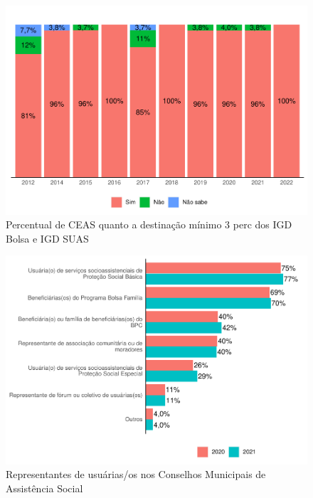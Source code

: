 \documentclass[
  brazilian]{report}
\begin{document}
\begin{figure}
\includegraphics{Censo-SUAS-2022_files/figure-latex/ceas_igd-1} \caption[Percentual de CEAS quanto a destinação mínimo 3 perc dos IGD Bolsa e IGD SUAS]{Percentual de CEAS quanto a destinação mínimo 3 perc dos IGD Bolsa e IGD SUAS}\label{fig:ceas_igd}
\end{figure}

\begin{figure}
\includegraphics{Censo-SUAS-2022_files/figure-latex/usu_cmun-1} \caption[Representantes de usuárias/os nos Conselhos Municipais de Assistência Social]{Representantes de usuárias/os nos Conselhos Municipais de Assistência Social}\label{fig:usu_cmun}
\end{figure}
\end{document}
